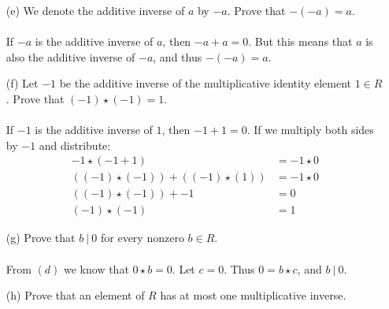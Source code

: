 \documentclass[11pt,fleqn]{article}
\begin{document}
\begin{itemize}
  
\item[(e)] We denote the additive inverse of $a$ by $-a$.  Prove that $-(-a) = a$.\\
  \\
If $-a$ is the additive inverse of $a$, then $-a + a = 0$.  But this means that $a$ is also the additive inverse of $-a$, and thus $-(-a) = a$.
  
\item[(f)] Let $-1$ be the additive inverse of the multiplicative identity element $1 \in R$.  Prove that $(-1) \star (-1) = 1$.\\
  \\
If $-1$ is the additive inverse of $1$, then $-1 + 1 = 0$.  If we multiply both sides by $-1$ and distribute:
\begin{align}
  -1 \star (-1 + 1) &= -1 \star 0\nonumber\\
  ((-1) \star (-1)) + ((-1) \star (1)) &= -1 \star 0\nonumber\\
  ((-1) \star (-1)) + -1 &= 0\nonumber\\
  (-1) \star (-1) &= 1\nonumber
\end{align}
  
\item[(g)] Prove that $b\:|\:0$ for every nonzero $b \in R$.\\
  \\
  From $(d)$ we know that $0 \star b = 0$.  Let $c = 0$.  Thus $0 = b \star c$, and $b\:|\:0$.
  
\item[(h)] Prove that an element of $R$ has at most one multiplicative inverse.\\
  \\
  
\end{itemize}
\end{document}
